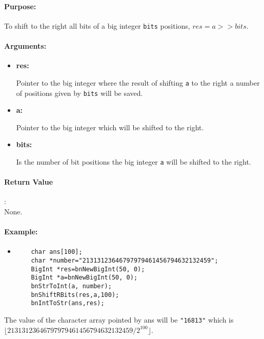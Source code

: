 \documentclass{book}
\begin{document}
\paragraph{Purpose:} 

To shift to the right all bits of a big integer \verb+bits+ positions, $res = a >> bits$.

\paragraph{Arguments:}

\begin{itemize}
\item{\bf res:}

Pointer to the big integer where the result of shifting \verb+a+ to the right a number of positions given by \verb+bits+ will be saved.

\item {\bf a:}

Pointer to the big integer which will be shifted to the right. 

\item {\bf bits:}

Is the number of bit positions the big integer \verb+a+ will be shifted to the right.

\end{itemize}

\paragraph{Return Value}:\\

None.

\paragraph{Example:}

\begin{itemize}
\item
\begin{verbatim}
    char ans[100];
    char *number="21313123646797979461456794632132459";
    BigInt *res=bnNewBigInt(50, 0);
    BigInt *a=bnNewBigInt(50, 0);
    bnStrToInt(a, number);
    bnShiftRBits(res,a,100);
    bnIntToStr(ans,res);
\end{verbatim}
\end{itemize}

The value of the character array pointed by ans will be \verb+"16813"+  which is $\lfloor21313123646797979461456794632132459 / 2^{100}\rfloor$.
\end{document}
